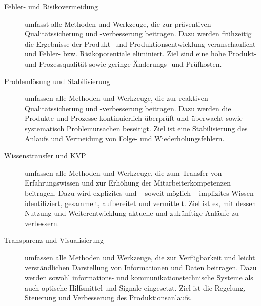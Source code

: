 \begin{description}
 \item[Fehler- und Risikovermeidung] umfasst
alle Methoden und Werkzeuge, die
zur präventiven Qualitätssicherung
und -verbesserung beitragen. Dazu
werden frühzeitig die Ergebnisse der
Produkt- und Produktionsentwicklung veranschaulicht und Fehler- bzw.
Risikopotentiale eliminiert. Ziel sind
eine hohe Produkt- und Prozessqualität sowie geringe Änderungs- und
Prüfkosten.

 \item[Problemlösung und Stabilisierung] umfassen alle Methoden und Werkzeuge,
die zur reaktiven Qualitätssicherung
und -verbesserung beitragen. Dazu
werden die Produkte und Prozesse
kontinuierlich überprüft und überwacht sowie systematisch Problemursachen beseitigt. Ziel ist eine Stabilisierung des Anlaufs und Vermeidung
von Folge- und Wiederholungsfehlern.

 \item[Wissenstransfer und KVP] umfassen
alle Methoden und Werkzeuge, die
zum Transfer von Erfahrungswissen
und zur Erhöhung der Mitarbeiterkompetenzen beitragen. Dazu wird
explizites und – soweit möglich – implizites Wissen identifiziert, gesammelt, aufbereitet und vermittelt. Ziel
ist es, mit dessen Nutzung und
Weiterentwicklung aktuelle und zukünftige Anläufe zu verbessern.

 \item[Transparenz und Visualisierung] umfassen alle Methoden und Werkzeuge,
die zur Verfügbarkeit und leicht verständlichen Darstellung von Informationen und Daten beitragen. Dazu
werden sowohl informations- und
kommunikationstechnische Systeme
als auch optische Hilfsmittel und Signale eingesetzt. Ziel ist die Regelung,
Steuerung und Verbesserung des Produktionsanlaufs.
\end{description}


\newpage

